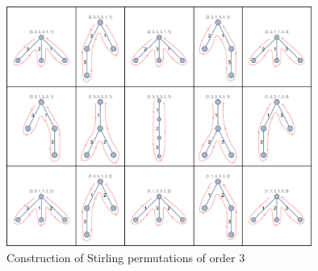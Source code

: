 \documentclass[12pt]{article}
\numberwithin{equation}{section}
\begin{document}
\begin{figure}[!htb]
    \centering
    \includegraphics[width=10cm]{Images/smalleulertours.jpg}
    \caption{Construction of Stirling permutations of order 3}
    \label{fig:stirling3graph}
\end{figure}
\clearpage
\end{document}
